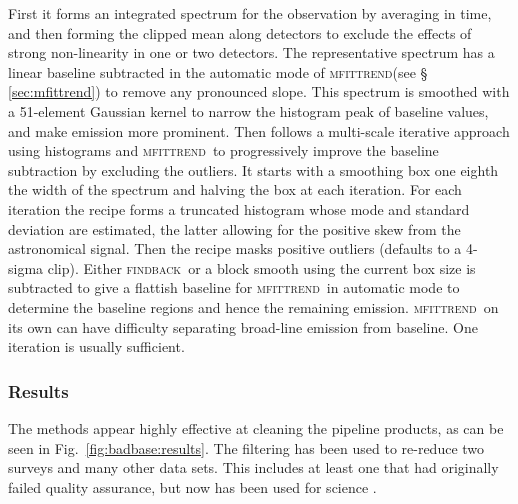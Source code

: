 \documentclass[useAMS,usenatbib]{mn2e}
\newcommand{\mfittrend}{\textsc{mfittrend}}
\newcommand{\findback}{\textsc{findback}}
\begin{document}
First it forms an integrated spectrum for the observation by averaging
in time, and then forming the clipped mean along detectors to exclude
the effects of strong non-linearity in one or two detectors.  The
representative spectrum has a linear baseline subtracted in the
automatic mode of \mfittrend (see \S\,\ref{sec:mfittrend}) to remove
any pronounced slope.  This spectrum is smoothed with a 51-element
Gaussian kernel to narrow the histogram peak of baseline values, and
make emission more prominent.  Then follows a multi-scale iterative
approach using histograms and \mfittrend\ to progressively improve the
baseline subtraction by excluding the outliers.  It starts with a
smoothing box one eighth the width of the spectrum and halving the box
at each iteration.  For each iteration the recipe forms a truncated
histogram whose mode and standard deviation are estimated, the latter
allowing for the positive skew from the astronomical signal.  Then the
recipe masks positive outliers (defaults to a 4-sigma clip).  Either
\findback\ or a block smooth using the current box size is subtracted
to give a flattish baseline for \mfittrend\ in automatic mode to
determine the baseline regions and hence the remaining emission.
\mfittrend\ on its own can have difficulty separating broad-line
emission from baseline.  One iteration is usually sufficient.

\subsubsection{Results}

The methods appear highly effective at cleaning the pipeline products,
as can be seen in Fig.~\ref{fig:badbase:results}. \citep[See][for
details of earlier reductions of these data.]{2010MNRAS.401..455C} The
filtering has been used to re-reduce two surveys and many other data
sets. This includes at least one that had originally failed quality
assurance, but now has been used for science
\citep{2013ApJ...767..126S}.
\end{document}
